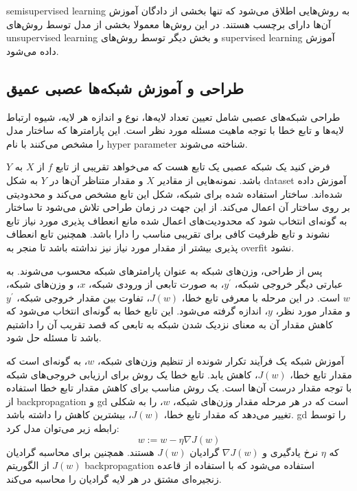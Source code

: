 \gls{semisupervised learning} به روش‌هایی اطلاق می‌شود که تنها بخشی از دادگان
آموزش آن‌ها دارای برچسب هستند. در این روش‌ها معمولا بخشی از مدل توسط روش‌های
\gls{unsupervised learning} و بخش دیگر توسط روش‌های \gls{supervised learning}
آموزش داده می‌شود.

\subsection{طراحی و آموزش شبکه‌ها عصبی عمیق}
طراحی شبکه‌های عصبی شامل تعیین تعداد لایه‌ها، نوع و اندازه هر لایه، شیوه ارتباط
لایه‌ها و تابع خطا با توجه ماهیت مسئله مورد نظر است. این پارامترها که ساختار مدل
را مشخص می‌کنند با نام \gls{hyper parameter} شناخته می‌شوند.

فرض کنید یک شبکه عصبی یک تابع هست که می‌خواهد تقریبی از تابع $f$ از $X$ به $Y$
باشد. نمونه‌هایی از مقادیر $X$ و مقدار متناظر آن‌ها در $Y$ به شکل \gls{dataset}
آموزش داده شده‌اند. ساختار استفاده شده برای شبکه، شکل این تابع مشخص می‌کند و
محدودیتی بر روی ساختار آن اعمال می‌کند. از این جهت در زمان طراحی تلاش می‌شود تا
ساختار به گونه‌ای انتخاب شود که محدودیت‌های اعمال شده مانع انعطاف پذیری مورد
نیاز تابع نشوند و تابع ظرفیت کافی برای تقریبی مناسب را دارا باشد. همچنین تابع
انعطاف پذیری بیشتر از مقدار مورد نیاز نیز نداشته باشد تا منجر به \gls{overfit}
نشود.

پس از طراحی، وزن‌های شبکه به عنوان پارامترهای شبکه محسوب می‌شوند. به عبارتی دیگر
خروجی شبکه، $y^\prime$، به صورت تابعی از ورودی شبکه، $x$، و وزن‌های شبکه، $w$
است. در این مرحله با معرفی تابع خطا، $J(w)$، تفاوت بین مقدار خروجی شبکه،
$y^\prime$ و مقدار مورد نظر، $y$، اندازه گرفته می‌شود. این تابع خطا به گونه‌ای
انتخاب می‌شود که کاهش مقدار آن به معنای نزدیک شدن شبکه به تابعی که قصد تقریب آن
را داشتیم باشد تا مسئله حل شود.

آموزش شبکه یک فرآیند تکرار شونده از تنظیم وزن‌های شبکه، $w$، به گونه‌ای است که
مقدار تابع خطا، $J(w)$، کاهش یابد. تابع خطا یک روش برای ارزیابی خروجی‌های شبکه
با توجه مقدار درست آن‌ها است. یک روش مناسب برای کاهش مقدار تابع خطا استفاده از
\gls{backpropagation} و \gls{gd} است که در هر مرحله مقدار وزن‌های شبکه، $w$، را
به شکلی تغییر می‌دهد که مقدار تابع خطا، $J(w)$، بیشترین کاهش را داشته باشد.
\gls{gd} را توسط رابطه زیر می‌توان مدل کرد:
\begin{equation}
    w := w - \eta \nabla J(w)
\end{equation}
که $\eta$ نرخ یادگیری و $\nabla J(w)$ گرادیان $J(w)$ هستند. همچنین برای محاسبه
گرادیان $J(w)$ از الگوریتم \gls{backpropagation} استفاده می‌شود که با استفاده از
قاعده زنجیره‌ای مشتق در هر لایه گرادیان را محاسبه می‌کند.

